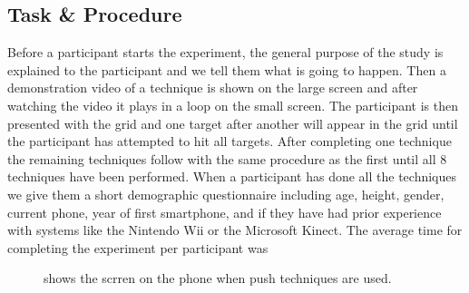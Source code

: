 \subsection{Task \& Procedure} \label{sec:procedure}
Before a participant starts the experiment, the general purpose of the study is explained to the participant and we tell them what is going to happen.
Then a demonstration video of a technique is shown on the large screen and after watching the video it plays in a loop on the small screen.
The participant is then presented with the grid and one target after another will appear in the grid until the participant has attempted to hit all targets.
After completing one technique the remaining techniques follow with the same procedure as the first until all 8 techniques have been performed.
When a participant has done all the techniques we give them a short demographic questionnaire including age, height, gender, current phone, year of first smartphone, and if they have had prior experience with systems like the Nintendo Wii or the Microsoft Kinect.
The average time for completing the experiment per participant was 

\begin{figure}[H]
\hspace{0.1\columnwidth}

\caption{\protect{} shows the scrren on the phone when push techniques are used.}
\end{figure}
